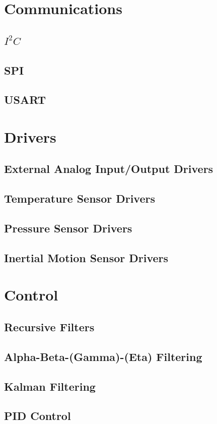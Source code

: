 \documentclass[10pt,letterpaper]{memoir} %
\newcommand{\iic}[0]{$I^{2}C$}
\begin{document}
\chapter{Communications}
\section{\iic}
\section{SPI}
\section{USART}

\chapter{Drivers}
\section{External Analog Input/Output Drivers}
\section{Temperature Sensor Drivers}
\section{Pressure Sensor Drivers}
\section{Inertial Motion Sensor Drivers}

\chapter{Control}
\section{Recursive Filters}
\section{Alpha-Beta-(Gamma)-(Eta) Filtering}
\section{Kalman Filtering}
\section{PID Control}
\end{document}
